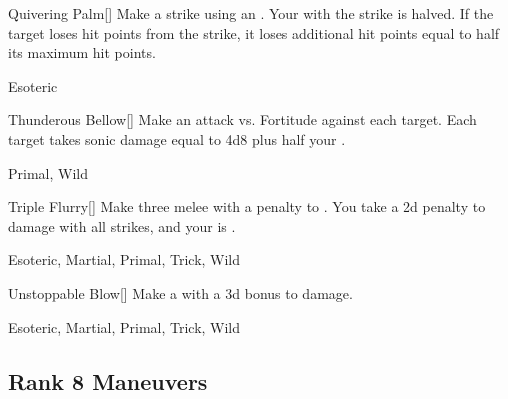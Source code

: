 \lowercase{\hypertarget{maneuver:Quivering Palm}{}}\label{maneuver:Quivering Palm}
\hypertarget{maneuver:Quivering Palm}{}
\begin{freeability}[Rank 7]{Quivering Palm}[]
Make a strike using an .
Your  with the strike is halved.
If the target loses hit points from the strike, it loses additional hit points equal to half its maximum hit points.


 Esoteric
\end{freeability}
\vspace{0.25em}



\lowercase{\hypertarget{maneuver:Thunderous Bellow}{}}\label{maneuver:Thunderous Bellow}
\hypertarget{maneuver:Thunderous Bellow}{}
\begin{freeability}[Rank 7]{Thunderous Bellow}[]
Make an attack vs. Fortitude against each target.
\hit Each target takes sonic damage equal to 4d8 plus half your .


 Primal, Wild
\end{freeability}
\vspace{0.25em}



\lowercase{\hypertarget{maneuver:Triple Flurry}{}}\label{maneuver:Triple Flurry}
\hypertarget{maneuver:Triple Flurry}{}
\begin{freeability}[Rank 7]{Triple Flurry}[]
Make three melee  with a  penalty to .
You take a \minus2d penalty to damage with all strikes, and your  is .


 Esoteric, Martial, Primal, Trick, Wild
\end{freeability}
\vspace{0.25em}



\lowercase{\hypertarget{maneuver:Unstoppable Blow}{}}\label{maneuver:Unstoppable Blow}
\hypertarget{maneuver:Unstoppable Blow}{}
\begin{freeability}[Rank 7]{Unstoppable Blow}[]
Make a  with a \plus3d bonus to damage.


 Esoteric, Martial, Primal, Trick, Wild
\end{freeability}
\vspace{0.25em}


\subsection{Rank 8 Maneuvers}